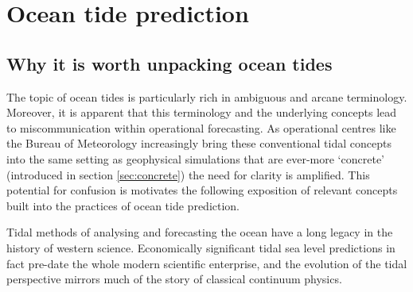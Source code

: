 \section{Ocean tide prediction}
\label{sec:tidesOverview}
\subsection{Why it is worth unpacking ocean tides}
\label{sec:semantics}
The topic of ocean tides is particularly rich in ambiguous and arcane terminology.  
Moreover, it is apparent that this terminology and the underlying concepts lead to miscommunication within operational forecasting.  As operational centres like the Bureau of Meteorology increasingly bring these conventional tidal concepts into the same setting as geophysical simulations that are ever-more `concrete' (introduced in section \ref{sec:concrete}) the need for clarity is amplified.  This potential for confusion is motivates the following exposition of relevant concepts built into the practices of ocean tide prediction.
\newline{}


Tidal methods of analysing and forecasting the ocean have a long legacy in the history of western science.  Economically significant tidal sea level predictions in fact pre-date the whole modern scientific enterprise, and the evolution of the tidal perspective mirrors much of the story of classical continuum physics.

